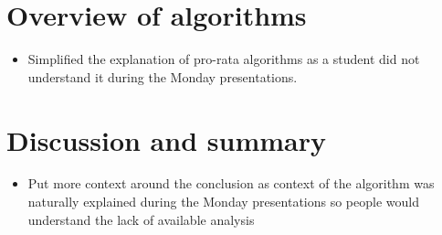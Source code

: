 \documentclass{article}
\begin{document}
\section{Overview of algorithms}
\begin{itemize}

  \item Simplified the explanation of pro-rata algorithms as a student did not understand it during the Monday presentations.
  
\end{itemize}
\section{Discussion and summary}
\begin{itemize} 

  \item Put more context around the conclusion as context of the algorithm was naturally explained  during the Monday presentations so people would understand the lack of available analysis
  
\end{itemize}
\end{document}
